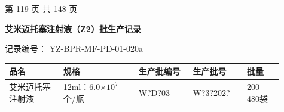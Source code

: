 \documentclass[UTF8,10pt,a4paper,fontset=fandol]{ctexart}
\newcommand{\fieldvalue}[1]{#1}
\newcommand{\handwritten}[1]{#1}
\begin{document}
\vfill

\begin{center}
第 119 页 共 148 页
\end{center}

\newpage

\begin{center}
\textbf{艾米迈托塞注射液（Z2）批生产记录}
\end{center}

\noindent
记录编号：
\fieldvalue{YZ-BPR-MF-PD-01-020a}

\begin{center}
\begin{tabular}{|p{0.18\linewidth}|p{0.25\linewidth}|p{0.18\linewidth}|p{0.18\linewidth}|p{0.12\linewidth}|}
\hline
品名 & 规格 & 生产批编号 & 生产批号 & 批量 \\
\hline
\fieldvalue{艾米迈托塞注射液}
&
\fieldvalue{12ml：6.0$\times 10^{7}$个/瓶}
&
\fieldvalue{\handwritten{W?D?03}}
&
\fieldvalue{\handwritten{W?3?202?}}
&
\fieldvalue{200--480袋}
\\
\hline
\end{tabular}
\end{center}
\end{document}
